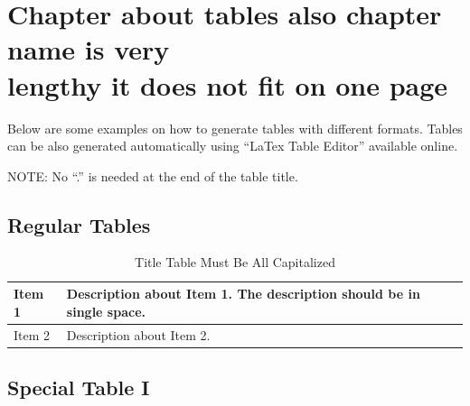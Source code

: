 \chapter[Chapter about tables also chapter name is very lengthy it does not fit on one page]{Chapter about tables also chapter name is very \\ \vskip -3mm lengthy it does not fit on one page}\label{chap_tables} 


\color{blue} Below are some examples on how to generate tables with different formats. Tables can be also generated automatically using ``LaTex Table Editor'' available online.

\color{red}  NOTE: No ``.'' is needed at the end of the table title.

\color{black}
\section{Regular Tables}

\begin{table}[th]
	
	\begin{singlespace}
		\caption{Title Table Must Be All Capitalized}
		\label{CF_Eq_Tab}       %
		
		
		\renewcommand{\arraystretch}{1.5}
		\centering
		
		\begin{tabular}
			{|m{ } |m{ }|} \hline
			
			Item 1 & Description about Item 1. The description should be in single space.  \\
			\hline
			
			
		Item 2 & Description about Item 2. \\ 
			\hline
			
		\end{tabular}
	\end{singlespace}
	
\end{table}




\section{Special Table I}


